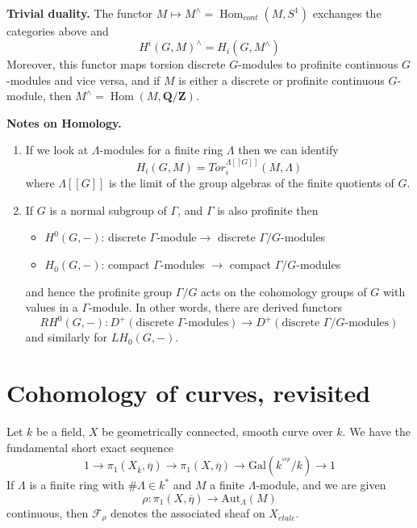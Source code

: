\documentclass{stacks-project}
\theoremstyle{plain}
\theoremstyle{definition}
\theoremstyle{remark}
\numberwithin{equation}{subsection}
\def\Hom{\mathop{\mathrm{Hom}}\nolimits}
\def\etale{{\acute{e}tale}}
\begin{document}
\medskip\noindent
{\bf Trivial duality.}
The functor $M\mapsto M^\wedge = \Hom_{cont}(M, S^1)$
exchanges the categories above and
$$
H^i(G, M)^\wedge = H_i(G, M^\wedge)
$$
Moreover, this functor maps torsion discrete $G$-modules to profinite
continuous $G$-modules and vice versa, and if $M$ is either a discrete or
profinite continuous $G$-module, then
$M^\wedge = \Hom(M, \mathbf{Q}/\mathbf{Z})$.

\medskip\noindent
{\bf Notes on Homology.}
\begin{enumerate}
\item If we look at $\Lambda$-modules for a finite ring $\Lambda$
then we can identify
$$
H_i(G, M)=Tor_i^{\Lambda[[G]]}(M, \Lambda)
$$
where $\Lambda[[G]]$ is the limit of the group algebras of the finite
quotients of $G$.
\item If $G$ is a normal subgroup of $\Gamma$, and $\Gamma$ is also
profinite then
\begin{itemize}
\item $H^0(G, -)$: discrete $\Gamma$-module$\to$ discrete
$\Gamma/G$-modules
\item $H_0(G, -)$: compact $\Gamma$-modules $\to$ compact
$\Gamma/G$-modules
\end{itemize}
and hence the profinite group $\Gamma/G$ acts on the cohomology groups
of $G$ with values in a $\Gamma$-module. In other words, there are derived
functors
$$
RH^0(G, -) :
D^{+}(\text{discrete }\Gamma\text{-modules})
\longrightarrow
D^{+}(\text{discrete }\Gamma/G\text{-modules})
$$
and similarly for $LH_0(G, -)$.
\end{enumerate}








\section{Cohomology of curves, revisited}
\label{section-cohomology-curves-revisited}

\noindent
Let $k$ be a field, $X$ be geometrically connected, smooth curve over $k$.
We have the fundamental short exact sequence
$$
1 \to
\pi_1(X_{\overline{k}}, \overline \eta) \to
\pi_1(X, \overline\eta) \to
\text{Gal}(k^{^{sep}}/k) \to 1
$$
If $\Lambda$ is a finite ring with $\#\Lambda\in k^*$ and $M$ a finite
$\Lambda$-module, and we are given
$$
\rho : \pi_1(X, \overline\eta) \to \text{Aut}_{\Lambda}(M)
$$
continuous, then $\mathcal{F}_\rho$ denotes the associated sheaf on
$X_\etale$.
\end{document}
